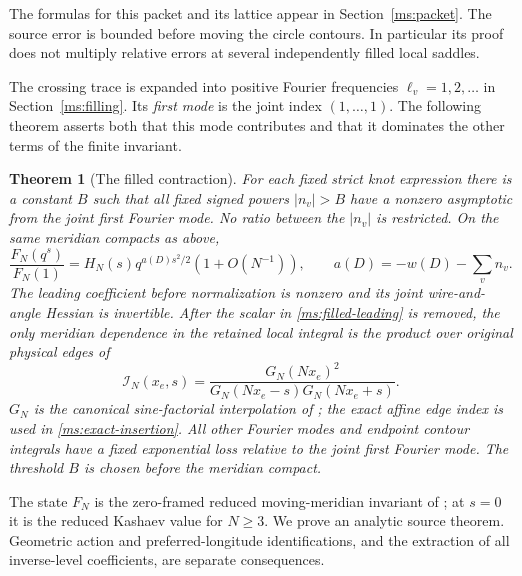 \documentclass[11pt]{article}
\numberwithin{equation}{section}
\newtheorem{theorem}{Theorem}[section]
\theoremstyle{definition}\newtheorem{definition}[theorem]{Definition}
\begin{document}
The formulas for this packet and its lattice appear in
Section~\ref{ms:packet}. The source error is bounded before moving
the circle contours. In particular its proof does not multiply
relative errors at several independently filled local saddles.

The crossing trace is expanded into positive Fourier frequencies
$\ell_v=1,2,\ldots$ in Section~\ref{ms:filling}. Its \emph{first
mode} is the joint index $(1,\ldots,1)$. The following theorem
asserts both that this mode contributes and that it dominates the
other terms of the finite invariant.

\begin{theorem}[The filled contraction]\label{ms:filled-main}
For each fixed strict knot expression there is a constant $B$ such
that all fixed signed powers $|n_v|>B$ have a nonzero asymptotic from the joint first Fourier mode. No ratio between the $|n_v|$ is restricted. On the same
meridian compacts as above,
\begin{equation}\label{ms:filled-leading}
 \frac{F_N(q^s)}{F_N(1)}=H_N(s)
  q^{a(D)s^2/2}(1+O(N^{-1})),\qquad
 a(D)=-w(D)-\sum_v n_v.
\end{equation}
The leading coefficient before normalization is nonzero and its
joint wire-and-angle Hessian is invertible. After the scalar in
\eqref{ms:filled-leading} is removed, the only meridian dependence
in the retained local integral is the product over original physical
edges of
\begin{equation}\label{ms:exact-insertion}
 \mathcal I_N(x_e,s)=
 \frac{G_N(Nx_e)^2}{G_N(Nx_e-s)G_N(Nx_e+s)}.
\end{equation}
$G_N$ is the canonical sine-factorial interpolation of
\cite[Lemma 2.1]{Asymptotics}; the exact affine edge index is used in
\eqref{ms:exact-insertion}. All other Fourier modes and endpoint contour integrals
have a fixed exponential loss relative to the joint first Fourier mode.
The threshold $B$ is chosen before the meridian compact.
\end{theorem}

The state $F_N$ is the zero-framed reduced moving-meridian invariant
of \cite{Meridian}; at $s=0$ it is the reduced Kashaev value for
$N\ge3$. We prove an analytic source theorem. Geometric action and
preferred-longitude identifications, and the extraction of all
inverse-level coefficients, are separate consequences.







\end{document}
